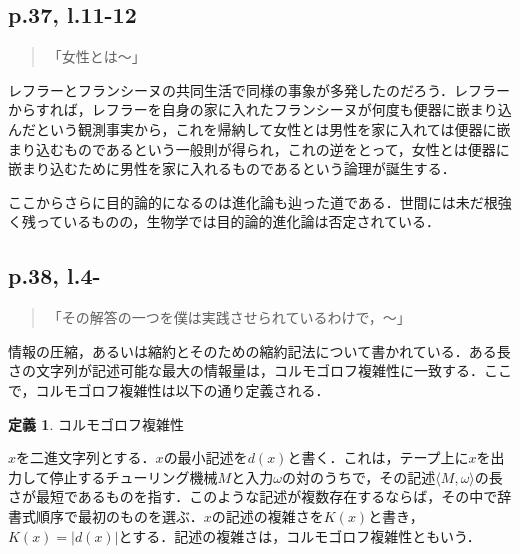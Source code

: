 \documentclass[10pt, a5paper, twoside]{jsarticle}
\theoremstyle{definition}
\newtheorem{dfn}{定義}
\begin{document}

            \subsection{p.37, l.11-12}

                \begin{quote}

                    「女性とは〜」

                \end{quote}

                レフラーとフランシーヌの共同生活で同様の事象が多発したのだろう．レフラーからすれば，レフラーを自身の家に入れたフランシーヌが何度も便器に嵌まり込んだという観測事実から，これを帰納して女性とは男性を家に入れては便器に嵌まり込むものであるという一般則が得られ，これの逆をとって，女性とは便器に嵌まり込むために男性を家に入れるものであるという論理が誕生する．

                ここからさらに目的論的になるのは進化論も辿った道である．世間には未だ根強く残っているものの，生物学では目的論的進化論は否定されている．

            \subsection{p.38, l.4-}

                \begin{quote}

                    「その解答の一つを僕は実践させられているわけで，〜」

                \end{quote}

                情報の圧縮，あるいは縮約とそのための縮約記法について書かれている．ある長さの文字列が記述可能な最大の情報量は，コルモゴロフ複雑性に一致する．ここで，コルモゴロフ複雑性は以下の通り定義される\cite{sip}．

                \begin{dfn}

                    コルモゴロフ複雑性

                    $x$を二進文字列とする．$x$の最小記述を$d(x)$と書く．これは，テープ上に$x$を出力して停止するチューリング機械$M$と入力$\omega$の対のうちで，その記述$\langle M, \omega \rangle$の長さが最短であるものを指す．このような記述が複数存在するならば，その中で辞書式順序で最初のものを選ぶ．$x$の記述の複雑さを$K(x)$と書き，$K(x) = | d(x) |$とする．記述の複雑さは，コルモゴロフ複雑性ともいう．

                \end{dfn}
\end{document}
